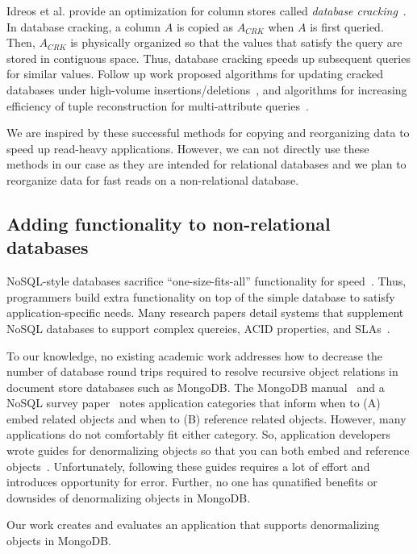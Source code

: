 Idreos et al. provide an optimization for column stores called {\em database cracking}~\cite{Pirk2007}. In database cracking, a column $A$ is copied as $A_{CRK}$ when $A$ is first queried. Then, $A_{CRK}$ is physically organized so that the values that satisfy the query are stored in contiguous space. Thus, database cracking speeds up subsequent queries for similar values. Follow up work proposed algorithms for updating cracked databases under high-volume insertions/deletions~\cite{Idreos2007}, and algorithms for increasing efficiency of tuple reconstruction for multi-attribute queries~\cite{Idreos2009}.

We are inspired by these successful methods for copying and reorganizing data to speed up read-heavy applications. However, we can not directly use these methods in our case as they are intended for relational databases and we plan to reorganize data for fast reads on a non-relational database. 

\subsection{Adding functionality to non-relational databases} 
NoSQL-style databases sacrifice ``one-size-fits-all'' functionality for speed~\cite{Strauch}. Thus, programmers build extra functionality on top of the simple database to satisfy application-specific needs. Many research papers detail systems that supplement NoSQL databases to support complex quereies, ACID properties, and SLAs~\cite{Decandia2007,Chang,Beaver2010,Baker}. 

To our knowledge, no existing academic work addresses how to decrease the number of database round trips required to resolve recursive object relations in document store databases such as MongoDB. The MongoDB manual~\cite{MongoDB2014} and a NoSQL survey paper~\cite{Strauch} notes application categories that inform when to (A) embed related objects and when to (B) reference related objects. However, many applications do not comfortably fit either category. So, application developers wrote guides for denormalizing objects so that you can both embed and reference objects~\cite{Wanschik2010}. Unfortunately, following these guides requires a lot of effort and introduces opportunity for error. Further, no one has qunatified benefits or downsides of denormalizing objects in MongoDB.

Our work creates and evaluates an application that supports denormalizing objects in MongoDB.



% 
